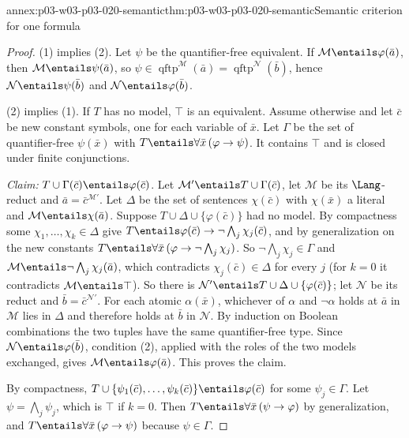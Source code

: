 \begin{annexitem}{annex:p03-w03-p03-020-semantic}{thm:p03-w03-p03-020-semantic}{Semantic criterion for one formula}
\begin{proof}
(1) implies (2). Let \(\psi\) be the quantifier-free equivalent. If
\(\mathcal M\entails\varphi(\bar a)\), then \(\mathcal M\entails\psi(\bar a)\),
so \(\psi\in\operatorname{qftp}^{\mathcal M}(\bar a)=
\operatorname{qftp}^{\mathcal N}(\bar b)\), hence
\(\mathcal N\entails\psi(\bar b)\) and \(\mathcal N\entails\varphi(\bar b)\).

(2) implies (1). If \(T\) has no model, \(\top\) is an equivalent. Assume
otherwise and let \(\bar c\) be new constant symbols, one for each variable
of \(\bar x\). Let \(\Gamma\) be the set of quantifier-free \(\psi(\bar x)\)
with \(T\entails\forall\bar x\,(\varphi\to\psi)\). It contains \(\top\)
and is closed under finite conjunctions.

\emph{Claim:} \(T\cup\Gamma(\bar c)\entails\varphi(\bar c)\). Let
\(\mathcal M'\entails T\cup\Gamma(\bar c)\), let \(\mathcal M\) be its
\(\Lang\)-reduct and \(\bar a=\bar c^{\mathcal M'}\). Let \(\Delta\) be the
set of sentences \(\chi(\bar c)\) with \(\chi(\bar x)\) a literal and
\(\mathcal M\entails\chi(\bar a)\). Suppose
\(T\cup\Delta\cup\{\varphi(\bar c)\}\) had no model. By compactness some
\(\chi_1,\ldots,\chi_k\in\Delta\) give
\(T\entails\varphi(\bar c)\to\neg\bigwedge_j\chi_j(\bar c)\), and by
generalization on the new constants
\(T\entails\forall\bar x\,(\varphi\to\neg\bigwedge_j\chi_j)\). So
\(\neg\bigwedge_j\chi_j\in\Gamma\) and
\(\mathcal M\entails\neg\bigwedge_j\chi_j(\bar a)\), which contradicts
\(\chi_j(\bar c)\in\Delta\) for every \(j\) (for \(k=0\) it contradicts
\(\mathcal M\entails\top\)). So there is
\(\mathcal N'\entails T\cup\Delta\cup\{\varphi(\bar c)\}\); let
\(\mathcal N\) be its reduct and \(\bar b=\bar c^{\mathcal N'}\). For each
atomic \(\alpha(\bar x)\), whichever of \(\alpha\) and \(\neg\alpha\) holds
at \(\bar a\) in \(\mathcal M\) lies in \(\Delta\) and therefore holds at
\(\bar b\) in \(\mathcal N\). By induction on Boolean combinations the two
tuples have the same quantifier-free type. Since
\(\mathcal N\entails\varphi(\bar b)\), condition (2), applied with the
roles of the two models exchanged, gives
\(\mathcal M\entails\varphi(\bar a)\). This proves the claim.

By compactness, \(T\cup\{\psi_1(\bar c),\ldots,\psi_k(\bar c)\}\entails
\varphi(\bar c)\) for some \(\psi_j\in\Gamma\). Let \(\psi=\bigwedge_j\psi_j\),
which is \(\top\) if \(k=0\). Then
\(T\entails\forall\bar x\,(\psi\to\varphi)\) by generalization, and
\(T\entails\forall\bar x\,(\varphi\to\psi)\) because \(\psi\in\Gamma\).
\end{proof}
\end{annexitem}

